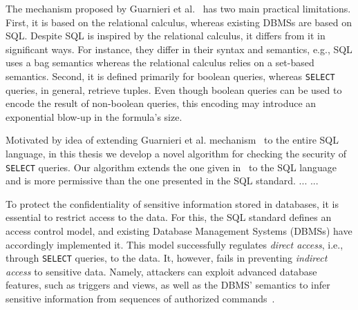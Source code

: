 The mechanism proposed by Guarnieri et al.~\cite{guarnieri2016strong} has two main practical limitations.
%
First, it is based on the relational calculus, whereas existing DBMSs are based on SQL.
%
Despite SQL is inspired by the relational calculus, it differs from it in significant ways.
%
For instance, they differ in their syntax and semantics, e.g., SQL uses a bag semantics whereas the relational calculus relies on a set-based semantics.
%
Second, it is defined primarily for boolean queries, whereas \texttt{SELECT} queries, in general, retrieve tuples.
%
Even though boolean queries can be used to encode the result of non-boolean queries, this encoding may introduce an exponential   blow-up in the formula's size.
%

Motivated by idea of extending Guarnieri et al. mechanism~\cite{guarnieri2016strong} to the entire SQL language, in this thesis we develop a novel algorithm for checking the security of \texttt{SELECT} queries.
%
Our algorithm extends the one given in~\cite{guarnieri2016strong} to the SQL language and is more permissive than the one presented in the SQL standard.
...
...


%



To protect the confidentiality of sensitive information stored in databases, it is essential to restrict access to the data.
%
For this, the SQL standard defines an access control model, and existing Database Management Systems (DBMSs) have accordingly implemented it. 
%
This model successfully regulates \emph{direct access}, i.e., through \texttt{SELECT} queries, to the data. It, however, fails in preventing \emph{indirect access} to sensitive data.
%
Namely, attackers can exploit advanced database features, such as triggers and views, as well as the DBMS' semantics to infer sensitive information from sequences of authorized commands~\cite{guarnieri2016strong}.
%


